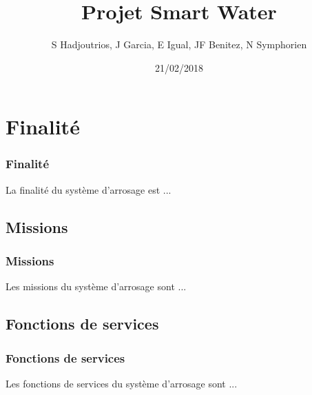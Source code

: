\documentclass{beamer}
\title{Projet Smart Water}
\author{S Hadjoutrios, J Garcia, E Igual, JF Benitez, N Symphorien} %
\institute{CNAM}
\date{21/02/2018}
\begin{document}
\begin{frame}[plain]
  \titlepage
\end{frame}


\section{Finalité}
\begin{frame}[label=finalite]
  \frametitle{Finalité}
  \rightskip=0pt\leftskip=0pt
  La finalité du système d'arrosage est ...
\end{frame}

\subsection{Missions}
\begin{frame}[label=missions]
  \frametitle{Missions}
  \rightskip=0pt\leftskip=0pt
  Les missions du système d'arrosage sont ...
\end{frame}

\subsection{Fonctions de services}
\begin{frame}[label=fonctionsdeservices]
  \frametitle{Fonctions de services}
  \rightskip=0pt\leftskip=0pt
  Les fonctions de services du système d'arrosage sont ...
\end{frame}
\end{document}
